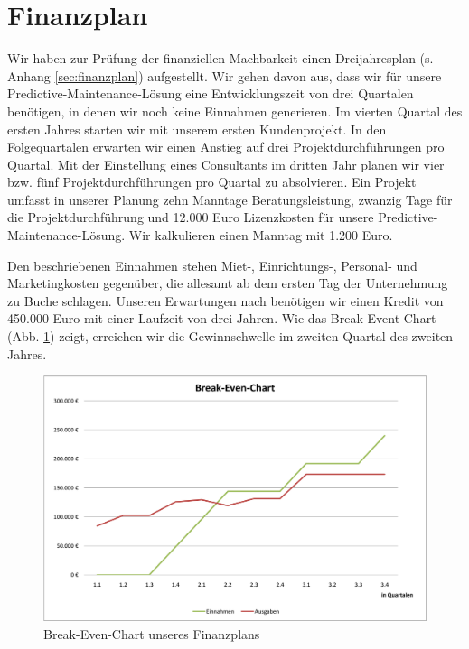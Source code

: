 \section{Finanzplan}
Wir haben zur Prüfung der finanziellen Machbarkeit einen Dreijahresplan (s. Anhang \ref{sec:finanzplan}) aufgestellt. Wir gehen davon aus, dass wir für unsere Predictive-Maintenance-Lösung eine Entwicklungszeit von drei Quartalen benötigen, in denen wir noch keine Einnahmen generieren. Im vierten Quartal des ersten Jahres starten wir mit unserem ersten Kundenprojekt. In den Folgequartalen erwarten wir einen Anstieg auf drei Projektdurchführungen pro Quartal. Mit der Einstellung eines Consultants im dritten Jahr planen wir vier bzw. fünf Projektdurchführungen pro Quartal zu absolvieren. Ein Projekt umfasst in unserer Planung zehn Manntage Beratungsleistung, zwanzig Tage für die Projektdurchführung und 12.000 Euro Lizenzkosten für unsere Predictive-Maintenance-Lösung. Wir kalkulieren einen Manntag mit 1.200 Euro.

Den beschriebenen Einnahmen stehen Miet-, Einrichtungs-, Personal- und Marketingkosten gegenüber, die allesamt ab dem ersten Tag der Unternehmung zu Buche schlagen. Unseren Erwartungen nach benötigen wir einen Kredit von 450.000 Euro mit einer Laufzeit von drei Jahren. Wie das Break-Event-Chart (Abb. \ref{fig:BreakEvenChart}) zeigt, erreichen wir die Gewinnschwelle im zweiten Quartal des zweiten Jahres. 

\vspace{2cm}
\begin{figure}[H]
\centering
\includegraphics[width=0.8\linewidth]{../Bilder/BreakEvenChart}
\caption{Break-Even-Chart unseres Finanzplans}
\label{fig:BreakEvenChart}
\end{figure}
